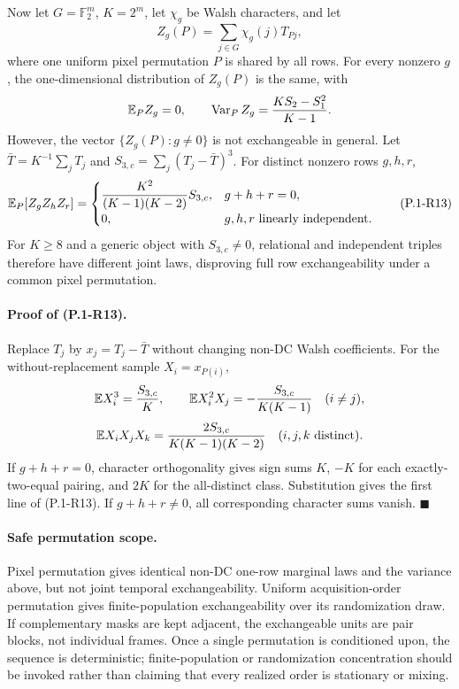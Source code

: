 Now let $G=\mathbb F_2^m$, $K=2^m$, let $\chi_g$ be Walsh characters,
and let
\[
 Z_g(P)=\sum_{j\in G}\chi_g(j)T_{Pj},
\]
where one uniform pixel permutation $P$ is shared by all rows.  For
every nonzero $g$, the one-dimensional distribution of $Z_g(P)$ is
the same, with
\[
 \mathbb E_PZ_g=0,
 \qquad
 \operatorname{Var}_PZ_g={KS_2-S_1^2\over K-1}.
\]
However, the vector $\{Z_g(P):g\ne0\}$ is not exchangeable in general.
Let $\bar T=K^{-1}\sum_jT_j$ and
$S_{3,c}=\sum_j(T_j-\bar T)^3$.  For distinct nonzero rows $g,h,r$,
\begin{equation}
 \mathbb E_P[Z_gZ_hZ_r]=
 \begin{cases}
 \displaystyle {K^2\over(K-1)(K-2)}S_{3,c},&g+h+r=0,\\[5pt]
 0,&g,h,r\text{ linearly independent}.
 \end{cases} \tag{P.1-R13}
\end{equation}
For $K\ge8$ and a generic object with $S_{3,c}\ne0$, relational and
independent triples therefore have different joint laws, disproving
full row exchangeability under a common pixel permutation.

\paragraph{Proof of (P.1-R13).}
Replace $T_j$ by $x_j=T_j-\bar T$ without changing non-DC Walsh
coefficients.  For the without-replacement sample $X_i=x_{P(i)}$,
\[
 \mathbb EX_i^3={S_{3,c}\over K},\qquad
 \mathbb EX_i^2X_j=-{S_{3,c}\over K(K-1)}\quad(i\ne j),
\]
\[
 \mathbb EX_iX_jX_k={2S_{3,c}\over K(K-1)(K-2)}
 \quad(i,j,k\text{ distinct}).
\]
If $g+h+r=0$, character orthogonality gives sign sums $K$, $-K$ for
each exactly-two-equal pairing, and $2K$ for the all-distinct class.
Substitution gives the first line of (P.1-R13).  If $g+h+r\ne0$, all
corresponding character sums vanish.
\hfill$\blacksquare$

\paragraph{Safe permutation scope.}
Pixel permutation gives identical non-DC one-row marginal laws and the
variance above, but not joint temporal exchangeability.  Uniform
acquisition-order permutation gives finite-population exchangeability
over its randomization draw.  If complementary masks are kept adjacent,
the exchangeable units are pair blocks, not individual frames.  Once a
single permutation is conditioned upon, the sequence is deterministic;
finite-population or randomization concentration should be invoked
rather than claiming that every realized order is stationary or mixing.


